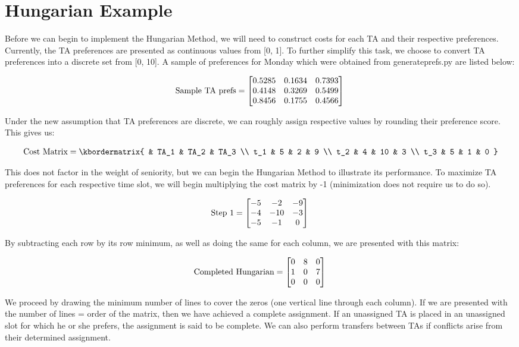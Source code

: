 \documentclass{article}
\begin{document}
\section*{Hungarian Example}
Before we can begin to implement the Hungarian Method, we will need to construct costs for each TA and their respective preferences. Currently, the TA preferences are presented as continuous values from [0, 1]. To further simplify this task, we choose to convert TA preferences into a discrete set from [0, 10].
A sample of preferences for Monday which were obtained from generate\textunderscore prefs.py are listed below:

\[
  \text{Sample TA prefs} = \begin{bmatrix}
    0.5285 & 0.1634 & 0.7393 \\
    0.4148 & 0.3269 & 0.5499\\
    0.8456 & 0.1755 & 0.4566
    \end{bmatrix} \\
\]

Under the new assumption that TA preferences are discrete, we can roughly assign respective values by rounding their preference score. This gives us:

\[
  \text{Cost Matrix} = \kbordermatrix{
    & TA_1 & TA_2 & TA_3 \\
    t_1 & 5 & 2 & 9 \\
    t_2 & 4 & 10 & 3 \\
    t_3 & 5 & 1 & 0  
  }
\]

This does not factor in the weight of seniority, but we can begin the Hungarian Method to illustrate its performance. To maximize TA preferences for each respective time slot, we will begin multiplying the cost matrix by -1 (minimization does not require us to do so).

\[
  \text{Step 1} = \begin{bmatrix}
    -5 & -2 & -9 \\
    -4 & -10 & -3\\
    -5 & -1 & 0
    \end{bmatrix} \\
\]

By subtracting each row by its row minimum, as well as doing the same for each column, we are presented with this matrix:

\[
  \text{Completed Hungarian} = \begin{bmatrix}
    0 & 8 & 0 \\
    1 & 0 & 7\\
    0 & 0 & 0
    \end{bmatrix} \\
\]

We proceed by drawing the minimum number of lines to cover the zeros (one vertical line through each column). If we are presented with the number of lines = order of the matrix, then we have achieved a complete assignment. If an unassigned TA is placed in an unassigned slot for which he or she prefers, the assignment is said to be complete. We can also perform transfers between TAs if conflicts arise from their determined assignment. 
\end{document}
